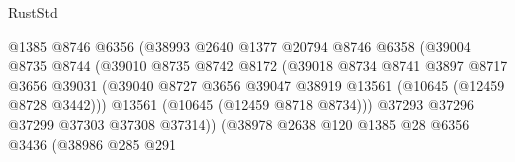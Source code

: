 \begin{lexlean}{RustStd}
\begin{coremodule}
                                          @1385
                                          @8746
                                          @6356
                                          (@38993
                                            @2640
                                            @1377
                                            @20794
                                            @8746
                                            @6358
                                            (@39004
                                              @8735
                                              @8744
                                              (@39010
                                                @8735
                                                @8742
                                                @8172
                                                (@39018
                                                  @8734
                                                  @8741
                                                  @3897
                                                  @8717
                                                  @3656
                                                  @39031
                                                  (@39040
                                                    @8727
                                                    @3656
                                                    @39047
                                                    @38919
                                                    @13561
                                                    (@10645 (@12459 @8728 @3442)))
                                                  @13561
                                                  (@10645 (@12459 @8718 @8734)))
                                                @37293
                                                @37296
                                                @37299
                                                @37303
                                                @37308
                                                @37314))
                                            (@38978
                                              @2638
                                              @120
                                              @1385
                                              @28
                                              @6356
                                              @3436
                                              (@38986
                                                @285
                                                @291

\end{coremodule}
\end{lexlean}
